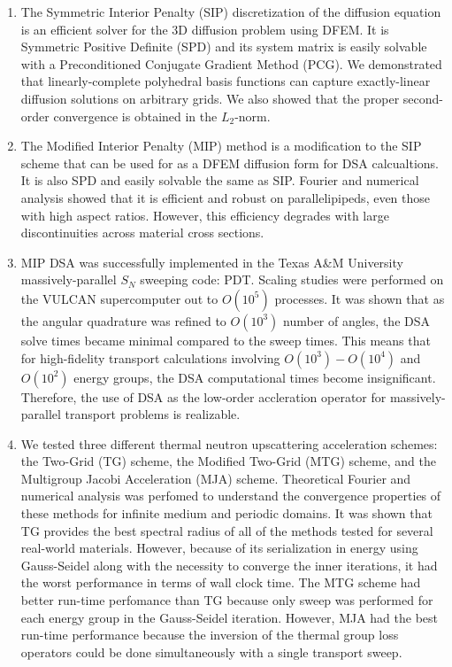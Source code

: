 \begin{enumerate}
\item The Symmetric Interior Penalty (SIP) discretization of the diffusion equation is an efficient solver for the 3D diffusion problem using DFEM. It is Symmetric Positive Definite (SPD) and its system matrix is easily solvable with a Preconditioned Conjugate Gradient Method (PCG). We demonstrated that linearly-complete polyhedral basis functions can capture exactly-linear diffusion solutions on arbitrary grids. We also showed that the proper second-order convergence is obtained in the $L_2$-norm.
\item The Modified Interior Penalty (MIP) method is a modification to the SIP scheme that can be used for as a DFEM diffusion form for DSA calcualtions. It is also SPD and easily solvable the same as SIP. Fourier and numerical analysis showed that it is efficient and robust on parallelipipeds, even those with high aspect ratios. However, this efficiency degrades with large discontinuities across material cross sections.
\item MIP DSA was successfully implemented in the Texas A\&M University massively-parallel $S_N$ sweeping code: PDT. Scaling studies were performed on the VULCAN supercomputer out to $O(10^5)$ processes. It was shown that as the angular quadrature was refined to $O(10^3)$ number of angles, the DSA solve times became minimal compared to the sweep times. This means that for high-fidelity transport calculations involving $O(10^3) - O(10^4)$ and $O(10^2)$ energy groups, the DSA computational times become insignificant. Therefore, the use of DSA as the low-order accleration operator for massively-parallel transport problems is realizable.
\item We tested three different thermal neutron upscattering acceleration schemes: the Two-Grid (TG) scheme, the Modified Two-Grid (MTG) scheme, and the Multigroup Jacobi Acceleration (MJA) scheme. Theoretical Fourier and numerical analysis was perfomed to understand the convergence properties of these methods for infinite medium and periodic domains. It was shown that TG provides the best spectral radius of all of the methods tested for several real-world materials. However, because of its serialization in energy using Gauss-Seidel along with the necessity to converge the inner iterations, it had the worst performance in terms of wall clock time. The MTG scheme had better run-time perfomance than TG because only sweep was performed for each energy group in the Gauss-Seidel iteration. However, MJA had the best run-time performance because the inversion of the thermal group loss operators could be done simultaneously with a single transport sweep.
\end{enumerate}

